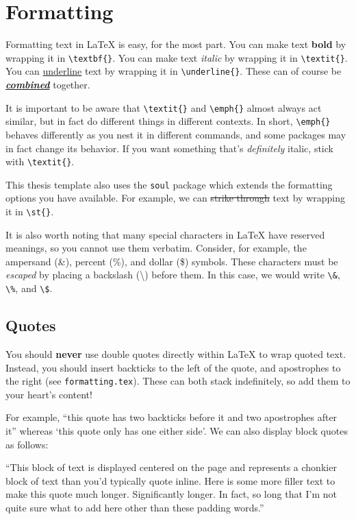 
\section{Formatting}%
\label{sec:basics-formatting}%

Formatting text in \LaTeX{} is easy, for the most part.
You can make text \textbf{bold} by wrapping it in \verb|\textbf{}|.
You can make text \textit{italic} by wrapping it in \verb|\textit{}|.
You can \underline{underline} text by wrapping it in \verb|\underline{}|.
These can of course be \textbf{\textit{\underline{combined}}} together.

It is important to be aware that \verb|\textit{}| and \verb|\emph{}| almost always act similar, but in fact do different things in different contexts.
In short, \verb|\emph{}| behaves differently as you nest it in different commands, and some packages may in fact change its behavior.
If you want something that's \textit{definitely} italic, stick with \verb|\textit{}|.

This thesis template also uses the \texttt{soul} package which extends the formatting options you have available.
For example, we can \st{strike through} text by wrapping it in \verb|\st{}|.

It is also worth noting that many special characters in \LaTeX{} have reserved meanings, so you cannot use them verbatim.
Consider, for example, the ampersand (\&), percent (\%), and dollar (\$) symbols.
These characters must be \textit{escaped} by placing a backslash (\textbackslash) before them.
In this case, we would write \verb|\&|, \verb|\%|, and \verb|\$|.

\subsection{Quotes}%
You should \textbf{never} use double quotes directly within \LaTeX{} to wrap quoted text.
Instead, you should insert backticks to the left of the quote, and apostrophes to the right (see \verb|formatting.tex|).
These can both stack indefinitely, so add them to your heart's content!

For example, ``this quote has two backticks before it and two apostrophes after it'' whereas `this quote only has one either side'.
We can also display block quotes as follows:

\begin{displayquote}[][]
  ``This block of text is displayed centered on the page and represents a chonkier block of text than you'd typically quote inline. Here is some more filler text to make this quote much longer. Significantly longer. In fact, so long that I'm not quite sure what to add here other than these padding words.'' 
\end{displayquote}

